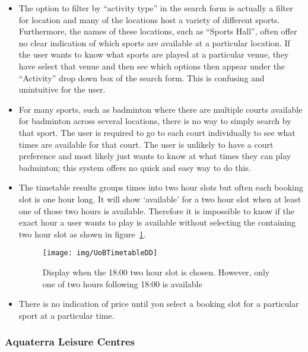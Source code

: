 \begin{itemize}
        \item The option to filter by ``activity type'' in the search form is actually a filter for location and many of the locations host a variety of different sports. Furthermore, the names of these locations, such as ``Sports Hall'', often offer no clear indication of which sports are available at a particular location. If the user wants to know what sports are played at a particular venue, they have select that venue and then see which options then appear under the ``Activity'' drop down box of the search form. This is confusing and unintuitive for the user.
        \item For many sports, such as badminton where there are multiple courts available for badminton across several locations, there is no way to simply search by that sport. The user is required to go to each court individually to see what times are available for that court. The user is unlikely to have a court preference and most likely just wants to know at what times they can play badminton; this system offers no quick and easy way to do this.
        \item The timetable results groups times into two hour slots but often each booking slot is one hour long. It will show `available' for a two hour slot when at least one of those two hours is available. Therefore it is impossible to know if the exact hour a user wants to play is available without selecting the containing two hour slot as shown in figure~\ref{fig:UoBTimetableDD}.

\begin{figure}
\begin{center}
\texttt{[image: img/UoBTimetableDD]}
\end{center}
\caption{Display when the 18:00 two hour slot is chosen. However, only one of two hours following 18:00 is available}\label{fig:UoBTimetableDD}
\end{figure}

        \item There is no indication of price until you select a booking slot for a particular sport at a particular time.
\end{itemize}

\subsubsection{Aquaterra Leisure Centres}
\label{ssub:aquaterra_leisure_centres}

